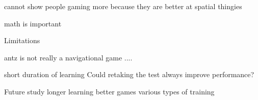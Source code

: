  cannot show people gaming more because they are better at spatial thingies

math is important

Limitations

 antz is not really a navigational game ....

short duration of learning
Could retaking the test always improve performance?

Future study
longer learning
better games
various types of training
































